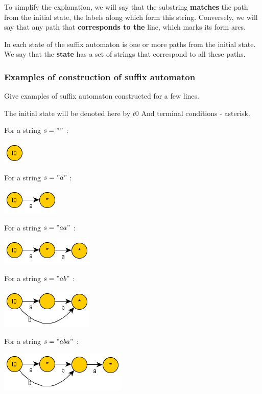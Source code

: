 To simplify the explanation, we will say that the substring \textbf{matches} the path from the initial state, the labels along which form this string. Conversely, we will say that any path that \textbf{corresponds to the} line, which marks its form arcs.

In each state of the suffix automaton is one or more paths from the initial state. We say that the \textbf{state} has a set of strings that correspond to all these paths.

\subsubsection{ Examples of construction of suffix automaton }

Give examples of suffix automaton constructed for a few lines.

The initial state will be denoted here by $t0$ And terminal conditions - asterisk.

For a string $s =" "$ :

\includegraphics[scale=0.5]{1.png}

For a string $s =" a"$ :

\includegraphics[scale=0.5]{2.png}

For a string $s =" aa"$ :

\includegraphics[scale=0.5]{3.png}

For a string $s =" ab"$ :

\includegraphics[scale=0.5]{4.png}

For a string $s =" aba"$ :

\includegraphics[scale=0.5]{5.png}

